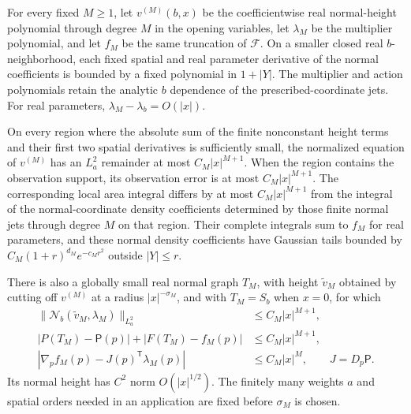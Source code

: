 \begin{lemma}\label{ref:finite-taylor}
For every fixed $M\ge1$, let $v^{(M)}(b,x)$ be the coefficientwise
real normal-height polynomial through degree $M$ in the opening
variables, let $\lambda_M$ be the multiplier polynomial, and let $f_M$
be the same truncation of $\mathcal F$.  On a smaller closed real
$b$-neighborhood, each fixed spatial and real parameter derivative of
the normal coefficients is bounded by a fixed polynomial in $1+|Y|$.
The multiplier and action polynomials retain the analytic $b$ dependence
of the prescribed-coordinate jets.  For real parameters,
$\lambda_M-\lambda_b=O(|x|)$.

On every region where the absolute sum of the finite nonconstant height
terms and their first two spatial derivatives is sufficiently small,
the normalized equation of $v^{(M)}$ has an $L^2_a$ remainder at most $C_M|x|^{M+1}$.
When the region contains the observation support, its observation error is
at most $C_M|x|^{M+1}$.  The corresponding
local area integral differs by at most $C_M|x|^{M+1}$ from the integral
of the normal-coordinate density coefficients determined by those
finite normal jets through degree $M$ on that region.  Their complete
integrals sum to $f_M$ for real parameters, and these normal density
coefficients have Gaussian tails bounded by
$C_M(1+r)^{d_M}e^{-c_Mr^2}$ outside $|Y|\le r$.

There is also a globally small real normal graph $T_M$, with height
$\widetilde v_M$ obtained by cutting off $v^{(M)}$ at a radius
$|x|^{-\sigma_M}$, and with $T_M=S_b$
when $x=0$, for which
\begin{align}
 \|\mathcal N_b(\widetilde v_M,\lambda_M)\|_{L^2_a}
       &\le C_M|x|^{M+1},\label{ref:taylor-equation}\\
 |P(T_M)-\mathsf P(p)|+|F(T_M)-f_M(p)|
       &\le C_M|x|^{M+1},\label{ref:taylor-action}\\
 |\nabla_p f_M(p)-J(p)^{\mathsf T}\lambda_M(p)|
       &\le C_M|x|^M,\qquad J=D_p\mathsf P.
       \label{ref:taylor-multiplier}
\end{align}
Its normal height has $C^2$ norm $O(|x|^{1/2})$.  The finitely many
weights $a$ and spatial orders needed in an application are fixed
before $\sigma_M$ is chosen.
\end{lemma}

